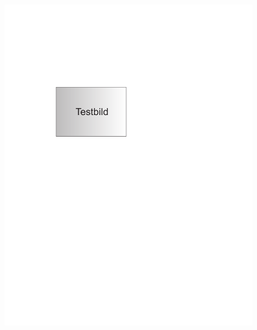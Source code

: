 \begin{figure}[t]
         {\includegraphics[scale=0.8]{bilder/testbild}\label{fig_testbild2_b}
    }\\
\end{figure}
